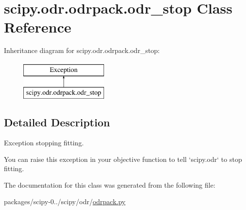 \hypertarget{classscipy_1_1odr_1_1odrpack_1_1odr__stop}{}\section{scipy.\+odr.\+odrpack.\+odr\+\_\+stop Class Reference}
\label{classscipy_1_1odr_1_1odrpack_1_1odr__stop}
Inheritance diagram for scipy.\+odr.\+odrpack.\+odr\+\_\+stop\+:\begin{figure}[H]
\begin{center}
\leavevmode
\includegraphics[height=2.000000cm]{classscipy_1_1odr_1_1odrpack_1_1odr__stop}
\end{center}
\end{figure}


\subsection{Detailed Description}
\begin{DoxyVerb}Exception stopping fitting.

You can raise this exception in your objective function to tell
`scipy.odr` to stop fitting.
\end{DoxyVerb}
 

The documentation for this class was generated from the following file\+:\begin{DoxyCompactItemize}
\item 
packages/scipy-\/0../scipy/odr/\hyperlink{odrpack_8py}{odrpack.\+py}\end{DoxyCompactItemize}
